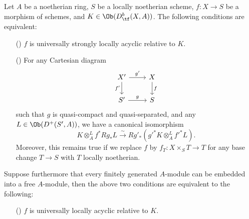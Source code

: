 \begin{theorem}\label{scheme morphism locally acyclity and base change theorem iff}
Let $A$ be a noetherian ring, $S$ be a locally noetherian scheme, $f:X\to S$ be a morphism of schemes, and $K\in\Ob(D^b_{\tf}(X,A))$. The following conditions are equivalent:
\begin{enumerate}
    \item[(\rmnum{1})] $f$ is universally strongly locally acyclic relative to $K$.
    \item[(\rmnum{2})] For any Cartesian diagram
    \[\begin{tikzcd}
    X'\ar[r,"g'"]\ar[d,swap,"f'"]&X\ar[d,"f"]\\
    S'\ar[r,"g"]&S
    \end{tikzcd}\]
    such that $g$ is quasi-compact and quasi-separated, and any $L\in\Ob(D^+(S',A))$, we have a canonical isomorphism
    \[K\otimes_A^Lf^*Rg_*L\stackrel{\sim}{\to} Rg'_*(g'^*K\otimes_A^Lf'^*L).\]
    Moreover, this remains true if we replace $f$ by $f_T:X\times_ST\to T$ for any base change $T\to S$ with $T$ locally noetherian.
\end{enumerate}
Suppose furthermore that every finitely generated $A$-module can be embedded into a free $A$-module, then the above two conditions are equivalent to the following:
\begin{enumerate}
    \item[(\rmnum{3})] $f$ is universally locally acyclic relative to $K$.
\end{enumerate}
\end{theorem}
